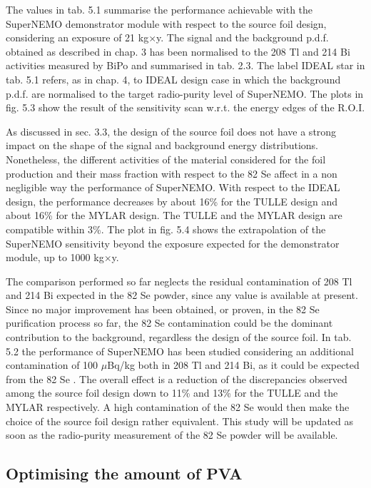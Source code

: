 \documentclass[main.tex]{subfiles}
\begin{document}
\NI The values in tab. 5.1 summarise the performance achievable with the SuperNEMO demonstrator module with respect to the source foil design, considering an exposure of 21 kg$\times$y. The signal and the background p.d.f. obtained as described in chap. 3 has been normalised to the 208 Tl and 214 Bi activities measured by BiPo and summarised in tab. 2.3. The label IDEAL star in tab. 5.1 refers, as in chap. 4, to IDEAL design case in which the background p.d.f. are normalised to the target radio-purity level of SuperNEMO. The plots in fig. 5.3 show the result of the sensitivity scan w.r.t. the energy edges of the R.O.I.


\bigskip


\NI As discussed in sec. 3.3, the design of the source foil does not have a strong impact on the shape of the signal and background energy distributions. Nonetheless, the different activities of the material considered for the foil production and their mass fraction with respect to the 82 Se affect in a non negligible way the performance of SuperNEMO. With respect to the IDEAL design, the performance decreases by about 16\% for the TULLE design and about 16\% for the MYLAR design. The TULLE and the MYLAR design are compatible within 3\%. The plot in fig. 5.4 shows the extrapolation of the SuperNEMO sensitivity beyond the exposure expected for the demonstrator module, up to 1000 kg$\times$y.


\bigskip


\NI The comparison performed so far neglects the residual contamination of 208 Tl and 214 Bi expected in the 82 Se powder, since any value is available at present. Since no major improvement has been obtained, or proven, in the 82 Se purification process so far, the 82 Se contamination could be the dominant contribution to the background, regardless the design of the source foil. In tab. 5.2 the performance of SuperNEMO has been studied considering an additional contamination of 100 $\mu$Bq/kg both in 208 Tl and 214 Bi, as it could be expected from the 82 Se . The overall effect is a reduction of the discrepancies observed among the source foil design down to 11\% and 13\% for the TULLE and the MYLAR respectively. A high contamination of the 82 Se would then make the choice of the source foil design rather equivalent. This study will be updated as soon as the radio-purity measurement of the 82 Se powder will be available.



\subsection{Optimising the amount of PVA}
\end{document}
